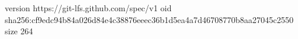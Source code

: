 version https://git-lfs.github.com/spec/v1
oid sha256:cf9edc94b84a026d84e4c38876eeec36b1d5ea4a7d46708770b8aa27045c2550
size 264
